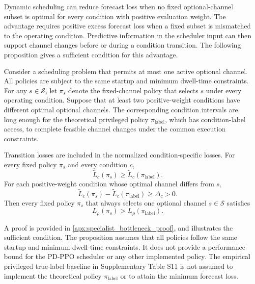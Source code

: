 Dynamic scheduling can reduce forecast loss when no fixed optional-channel
subset is optimal for every condition with positive evaluation weight. The
advantage requires positive excess forecast loss when a fixed subset is
mismatched to the operating condition. Predictive information in the scheduler
input can then support channel changes before or during a condition transition.
The following proposition gives a sufficient condition for this advantage.

\begin{proposition}
\label{prop:specialist_bottleneck}
Consider a scheduling problem that permits at most one active optional channel.
All policies are subject to the same startup and minimum dwell-time
constraints. For any $s\in\mathcal{S}$, let $\pi_s$ denote the fixed-channel
policy that selects $s$ under every operating condition. Suppose that at least
two positive-weight conditions have different optimal optional channels. The
corresponding condition intervals are long enough for the theoretical privileged
policy $\pi_{\text{label}}$, which has condition-label access, to complete
feasible channel changes under the common
execution constraints.

Transition losses are included in the normalized condition-specific losses.
For every fixed policy $\pi_s$ and every condition $c$,
\[
\widetilde L_c(\pi_s)
\geq
\widetilde L_c(\pi_{\text{label}}).
\]
For each positive-weight condition whose optimal channel differs from $s$,
\[
\widetilde L_c(\pi_s)
-
\widetilde L_c(\pi_{\text{label}})
\geq
\Delta_c
>
0.
\]
Then every fixed policy $\pi_s$ that always selects one optional channel
$s\in\mathcal{S}$ satisfies
\[
L_\rho(\pi_s)
>
L_\rho(\pi_{\text{label}}).
\]
\end{proposition}

A proof is provided in \ref{apx:specialist_bottleneck_proof}, and
 illustrates the sufficient condition. The
proposition assumes that all policies follow the same startup and minimum
dwell-time constraints. It does not provide a performance bound for the
PD-PPO scheduler or any other implemented policy. The empirical privileged true-label baseline in
Supplementary Table S11 is not assumed to implement the theoretical
policy $\pi_{\text{label}}$ or to attain the minimum forecast
loss.


